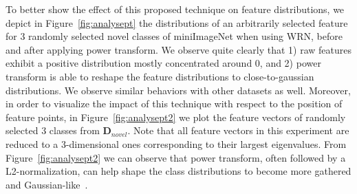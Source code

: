 \documentclass[review]{elsarticle}
\begin{document}
To better show the effect of this proposed technique on feature distributions, we depict in Figure~\ref{fig:analysept} the distributions of an arbitrarily selected feature for 3 randomly selected novel classes of miniImageNet when using WRN, before and after applying power transform. We observe quite clearly that 1) raw features exhibit a positive distribution mostly concentrated around 0, and 2) power transform is able to reshape the feature distributions to close-to-gaussian distributions. We observe similar behaviors with other datasets as well. Moreover, in order to visualize the impact of this technique with respect to the position of feature points, in Figure~\ref{fig:analysept2} we plot the feature vectors of randomly selected 3 classes from $\mathbf{D}_{novel}$. Note that all feature vectors in this experiment are reduced to a 3-dimensional ones corresponding to their largest eigenvalues. From Figure~\ref{fig:analysept2} we can observe that power transform, often followed by a L2-normalization, can help shape the class distributions to become more gathered and Gaussian-like~\cite{DBLP:journals/corr/abs-2102-05176}. 
\end{document}
